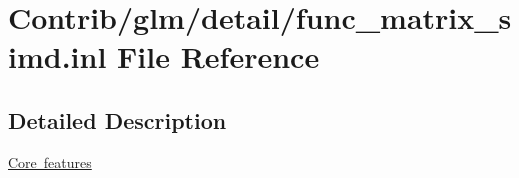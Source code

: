 \hypertarget{func__matrix__simd_8inl}{}\section{Contrib/glm/detail/func\+\_\+matrix\+\_\+simd.inl File Reference}
\label{func__matrix__simd_8inl}


\subsection{Detailed Description}
\mbox{\hyperlink{group__core}{Core features}} 